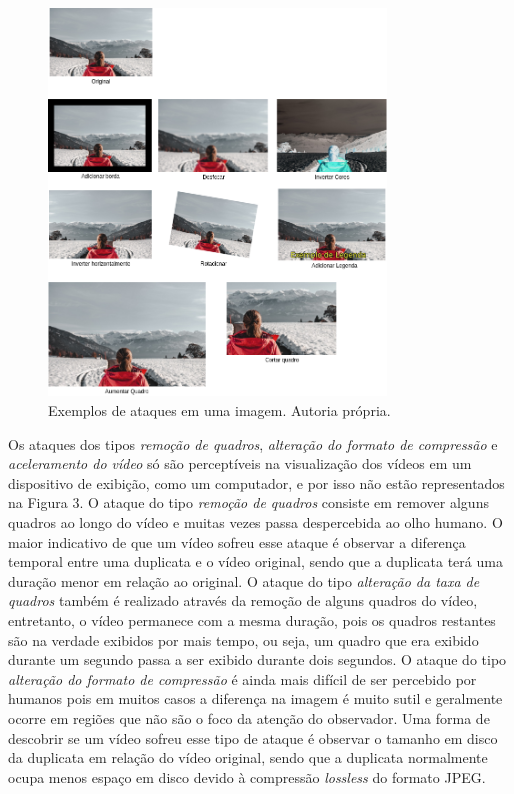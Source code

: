     	\begin{figure}[h]
        \centering
        \includegraphics[width=0.8\textwidth]{dados/figuras/Ataques.png}
        \caption{Exemplos de ataques em uma imagem. Autoria própria.}
    	\label{fig:ataques}
    \end{figure}

Os ataques dos tipos \textit{remoção de quadros}, \textit{alteração do formato de compressão} e \textit{aceleramento do vídeo} só são perceptíveis na visualização dos vídeos em um dispositivo de exibição, como um computador, e por isso não estão representados na Figura 3. O ataque do tipo \textit{remoção de quadros} consiste em remover alguns quadros ao longo do vídeo e muitas vezes passa despercebida ao olho humano. O maior indicativo de que um vídeo sofreu esse ataque é observar a diferença temporal entre uma duplicata e o vídeo original, sendo que a duplicata terá uma duração menor em relação ao original. O ataque do tipo \textit{alteração da taxa de quadros} também é realizado através da remoção de alguns quadros do vídeo, entretanto, o vídeo permanece com a mesma duração, pois os quadros restantes são na verdade exibidos por mais tempo, ou seja, um quadro que era exibido durante um segundo passa a ser exibido durante dois segundos. O ataque do tipo \textit{alteração do formato de compressão} é ainda mais difícil de ser percebido por humanos pois em muitos casos a diferença na imagem é muito sutil e geralmente ocorre em regiões que não são o foco da atenção do observador. Uma forma de descobrir se um vídeo sofreu esse tipo de ataque é observar o tamanho em disco da duplicata em relação do vídeo original, sendo que a duplicata normalmente ocupa menos espaço em disco devido à compressão \textit{lossless} do formato JPEG.

